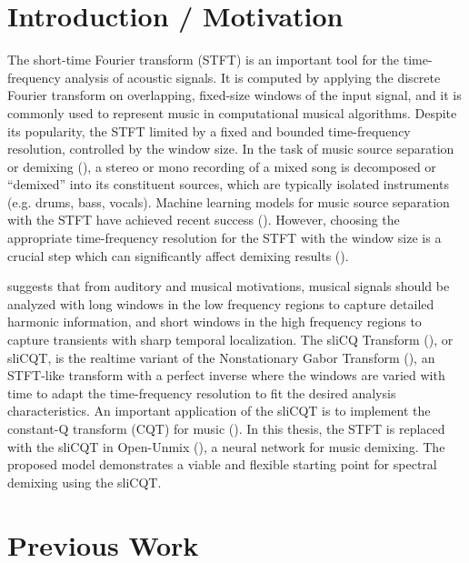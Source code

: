 \documentclass[letter,12pt]{article}
\title{\ThesisTitle}
\author{Sevag Hanssian, sevag.hanssian@mail.mcgill.ca}
\begin{document}
\maketitle

\section{Introduction / Motivation}


The short-time Fourier transform (STFT) is an important tool for the time-frequency analysis of acoustic signals. It is computed by applying the discrete Fourier transform on overlapping, fixed-size windows of the input signal, and it is commonly used to represent music in computational musical algorithms. Despite its popularity, the STFT limited by a fixed and bounded time-frequency resolution, controlled by the window size. In the task of music source separation or demixing (\cite{musicsepgood}), a stereo or mono recording of a mixed song is decomposed or ``demixed'' into its constituent sources, which are typically isolated instruments (e.g. drums, bass, vocals). Machine learning models for music source separation with the STFT have achieved recent success (\cite{sisec2018}). However, choosing the appropriate time-frequency resolution for the STFT with the window size is a crucial step which can significantly affect demixing results (\cite{tftradeoff1}).

 \textcite{doerflerphd} suggests that from auditory and musical motivations, musical signals should be analyzed with long windows in the low frequency regions to capture detailed harmonic information, and short windows in the high frequency regions to capture transients with sharp temporal localization. The sliCQ Transform (\cite{invertiblecqt}), or sliCQT, is the realtime variant of the Nonstationary Gabor Transform (\cite{balazs}), an STFT-like transform with a perfect inverse where the windows are varied with time to adapt the time-frequency resolution to fit the desired analysis characteristics. An important application of the sliCQT is to implement the constant-Q transform (CQT) for music (\cite{jbrown}). In this thesis, the STFT is replaced with the sliCQT in Open-Unmix (\cite{umx}), a neural network for music demixing. The proposed model demonstrates a viable and flexible starting point for spectral demixing using the sliCQT.

\section{Previous Work}
\end{document}
